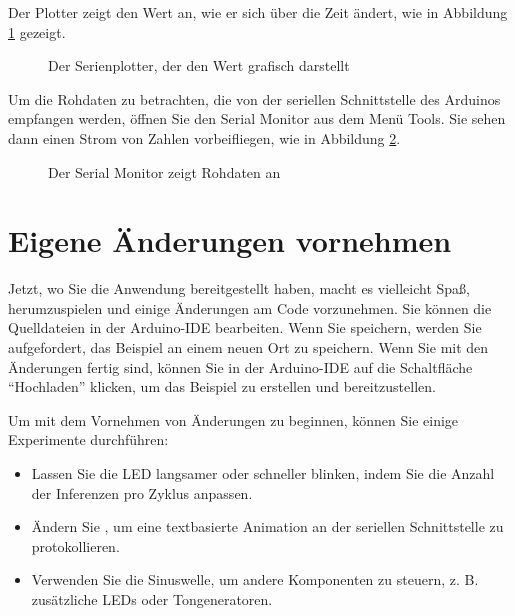 Der Plotter zeigt den Wert an, wie er sich über die Zeit ändert, wie in Abbildung \ref{fig:ArduSerialGraph} gezeigt. 

\begin{figure}
    \centering
    
    \caption{Der Serienplotter, der den Wert grafisch darstellt}\label{fig:ArduSerialGraph}
\end{figure} 



Um die Rohdaten zu betrachten, die von der seriellen Schnittstelle des Arduinos empfangen werden, öffnen Sie den Serial Monitor aus dem Menü Tools. Sie sehen dann einen Strom von Zahlen vorbeifliegen, wie in Abbildung \ref{fig:ArduSerialRaw}.

\begin{figure}
    \centering
    
    \caption{Der Serial Monitor zeigt Rohdaten an}\label{fig:ArduSerialRaw}
\end{figure} 
	
 	
\section{Eigene Änderungen vornehmen}

Jetzt, wo Sie die Anwendung bereitgestellt haben, macht es vielleicht Spaß, herumzuspielen und einige Änderungen am Code vorzunehmen. Sie können die Quelldateien in der Arduino-IDE bearbeiten. Wenn Sie speichern, werden Sie aufgefordert, das Beispiel an einem neuen Ort zu speichern. Wenn Sie mit den Änderungen fertig sind, können Sie in der Arduino-IDE auf die Schaltfläche ``Hochladen'' klicken, um das Beispiel zu erstellen und bereitzustellen.

Um mit dem Vornehmen von Änderungen zu beginnen, können Sie einige Experimente durchführen:

\begin{itemize}
  \item Lassen Sie die LED langsamer oder schneller blinken, indem Sie die Anzahl der Inferenzen pro Zyklus anpassen.
  \item  Ändern Sie , um eine textbasierte Animation an der seriellen Schnittstelle zu protokollieren.
  \item  Verwenden Sie die Sinuswelle, um andere Komponenten zu steuern, z. B. zusätzliche LEDs oder Tongeneratoren.
\end{itemize}
 	
 	
 	
